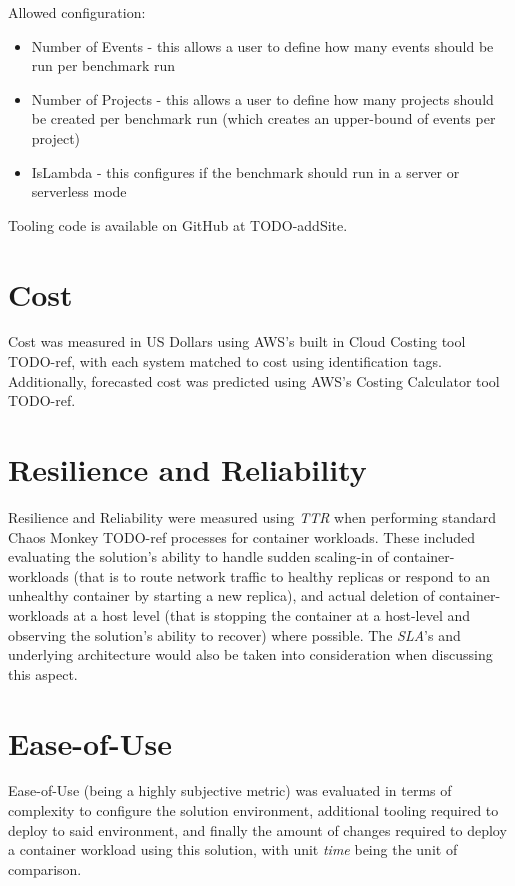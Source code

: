 Allowed configuration:
\begin{itemize}
  \item Number of Events - this allows a user to define how many events should be run per benchmark run
  \item Number of Projects - this allows a user to define how many projects should be created per benchmark run (which creates an upper-bound of events per project)
  \item IsLambda - this configures if the benchmark should run in a server or serverless mode
\end{itemize}

Tooling code is available on GitHub at TODO-addSite.

\section{Cost}
Cost was measured in US Dollars using AWS's built in Cloud Costing tool TODO-ref, with each system matched to cost using identification tags.
Additionally, forecasted cost was predicted using AWS's Costing Calculator tool TODO-ref.

\section{Resilience and Reliability}
Resilience and Reliability were measured using \textit{TTR} when performing standard Chaos Monkey TODO-ref processes for container workloads.
These included evaluating the solution's ability to handle sudden scaling-in of container-workloads (that is to route network traffic to healthy replicas or respond to an unhealthy container by starting a new replica),
and actual deletion of container-workloads at a host level (that is stopping the container at a host-level and observing the solution's ability to recover) where possible.
The \textit{SLA}'s and underlying architecture would also be taken into consideration when discussing this aspect.

\section{Ease-of-Use}
Ease-of-Use (being a highly subjective metric) was evaluated in terms of complexity to configure the solution environment, additional tooling required to deploy to said environment,
and finally the amount of changes required to deploy a container workload using this solution, with unit \textit{time} being the unit of comparison.
